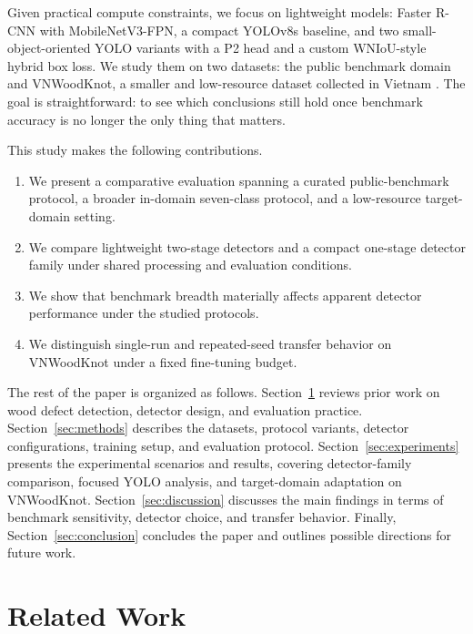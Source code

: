 \documentclass[journal,article,submit,moreauthors,pdftex]{Definitions/tsp}
\begin{document}
Given practical compute constraints, we focus on lightweight models: Faster R-CNN with MobileNetV3-FPN, a compact YOLOv8s baseline, and two small-object-oriented YOLO variants with a P2 head and a custom WNIoU-style hybrid box loss. We study them on two datasets: the public benchmark domain \citep{kodytek_dataset} and VNWoodKnot, a smaller and low-resource dataset collected in Vietnam \citep{TRAN2025112039}. The goal is straightforward: to see which conclusions still hold once benchmark accuracy is no longer the only thing that matters.

This study makes the following contributions.

\begin{enumerate}[leftmargin=1.5em]
  \item We present a comparative evaluation spanning a curated public-benchmark protocol, a broader in-domain seven-class protocol, and a low-resource target-domain setting.
  \item We compare lightweight two-stage detectors and a compact one-stage detector family under shared processing and evaluation conditions.
  \item We show that benchmark breadth materially affects apparent detector performance under the studied protocols.
    \item We distinguish single-run and repeated-seed transfer behavior on VNWoodKnot under a fixed fine-tuning budget.
\end{enumerate}

The rest of the paper is organized as follows. Section~\ref{sec:related-work} reviews prior work on wood defect detection, detector design, and evaluation practice. Section~\ref{sec:methods} describes the datasets, protocol variants, detector configurations, training setup, and evaluation protocol. Section~\ref{sec:experiments} presents the experimental scenarios and results, covering detector-family comparison, focused YOLO analysis, and target-domain adaptation on VNWoodKnot. Section~\ref{sec:discussion} discusses the main findings in terms of benchmark sensitivity, detector choice, and transfer behavior. Finally, Section~\ref{sec:conclusion} concludes the paper and outlines possible directions for future work.

\section{Related Work}
\label{sec:related-work}

\end{document}
